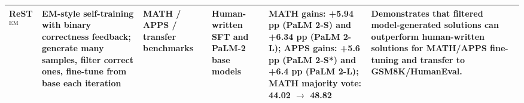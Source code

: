 \begin{table}[t]
{\begin{tabular}{p{2.9cm}p{3.0cm}p{2.7cm}p{2.8cm}p{2.8cm}p{4.8cm}}
ReST$^{\mathrm{EM}}$ \cite{restem2023} & EM-style self-training with binary correctness feedback; generate many samples, filter correct ones, fine-tune from base each iteration & MATH / APPS / transfer benchmarks & Human-written SFT and PaLM-2 base models & MATH gains: +5.94 pp (PaLM 2-S) and +6.34 pp (PaLM 2-L); APPS gains: +5.6 pp (PaLM 2-S*) and +6.4 pp (PaLM 2-L); MATH majority vote: 44.02 $\rightarrow$ \textbf{48.82} & Demonstrates that filtered model-generated solutions can outperform human-written solutions for MATH/APPS fine-tuning and transfer to GSM8K/HumanEval. \\
\bottomrule
\end{tabular}%
}
\end{table}

\begin{table}[t]
\centering
\small
\caption{Self-Refine comparison table from the main reported results.  Rows report Base vs. Base+Self-Refine for GPT-3, ChatGPT, and GPT-4; metrics are task-specific as defined in the source paper.}
\label{tab:self-refine-main-results}
\end{table}

